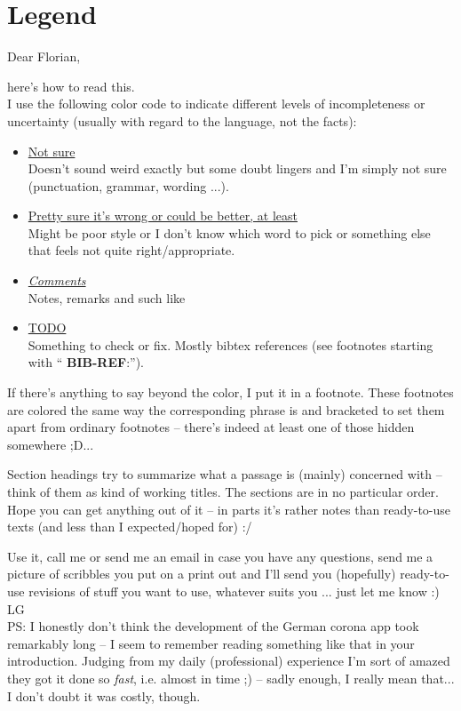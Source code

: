 \documentclass{article}
\newcommand*{\TODO}[2][todoC]{{\color{#1} #2}}
\newcommand*{\TODOsty}[2][styC]{\TODO[#1]{#2}}
\newcommand*{\TODOnsr}[2][nsrC]{\TODO[#1]{#2}}
\newcommand*{\NOTE}[2][noteC]{\TODO[#1]{\textit{#2}}}
\begin{document}
\section{Legend}
Dear Florian,

here's how to read this.\medskip\\

I use the following color code to indicate different levels of incompleteness or uncertainty (usually with regard to the language, not the facts):
\begin{itemize}
\item \TODOnsr{\underline{Not sure}}\\
  Doesn't sound weird exactly but some doubt lingers and I'm simply not sure
  (punctuation, grammar, wording ...).
\item \TODOsty{\underline{Pretty sure it's wrong or could be better, at least}}\\
  Might be poor style or I don't know which word to pick or something else
  that feels not quite right/appropriate.
\item \NOTE{\underline{Comments}}\\
  Notes, remarks and such like
\item \TODO{\underline{TODO}}\\
  Something to check or fix. Mostly bibtex references (see footnotes starting with ``\TODO{\textbf{BIB-REF}:}'').
\end{itemize}

If there's anything to say beyond the color, I put it in a footnote. These footnotes are colored the same way the corresponding phrase is and bracketed to set them apart from ordinary footnotes -- there's indeed at least one of those hidden somewhere ;D...

Section headings try to summarize what a passage is (mainly) concerned with -- think of them as kind of working titles.
The sections are in no particular order.\medskip\\

Hope you can get anything out of it -- in parts it's rather notes than ready-to-use texts (and less than I expected/hoped for) :/

Use it, call me or send me an email in case you have any questions, send me a picture of scribbles you put on a print out and I'll send you (hopefully) ready-to-use revisions of stuff you want to use, whatever suits you ... just let me know :)\medskip\\

LG\bigskip\\
PS: I honestly don't think the development of the German corona app took remarkably long -- I seem to remember reading something like that in your introduction.
Judging from my daily (professional) experience I'm sort of
amazed they got it done so \textit{fast}, i.e. almost in time ;) -- sadly enough, I really mean that...
I don't doubt it was costly, though.
\end{document}
